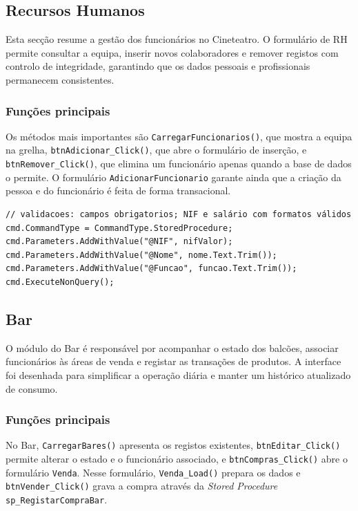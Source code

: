 \documentclass[11pt,a4paper]{article}
\begin{document}
\newpage

\subsection{Recursos Humanos}
Esta secção resume a gestão dos funcionários no Cineteatro. O formulário de RH permite consultar a equipa, inserir novos colaboradores e remover registos com controlo de integridade, garantindo que os dados pessoais e profissionais permanecem consistentes.

\subsubsection{Funções principais}
Os métodos mais importantes são \texttt{CarregarFuncionarios()}, que mostra a equipa na grelha, \texttt{btnAdicionar_Click()}, que abre o formulário de inserção, e \texttt{btnRemover_Click()}, que elimina um funcionário apenas quando a base de dados o permite. O formulário \texttt{AdicionarFuncionario} garante ainda que a criação da pessoa e do funcionário é feita de forma transacional.

\begin{lstlisting}[language={[Sharp]C}, caption=Inserção de funcionário (excerto)]
// validacoes: campos obrigatorios; NIF e salário com formatos válidos
cmd.CommandType = CommandType.StoredProcedure;
cmd.Parameters.AddWithValue("@NIF", nifValor);
cmd.Parameters.AddWithValue("@Nome", nome.Text.Trim());
cmd.Parameters.AddWithValue("@Funcao", funcao.Text.Trim());
cmd.ExecuteNonQuery();
\end{lstlisting}

\newpage

\subsection{Bar}
O módulo do Bar é responsável por acompanhar o estado dos balcões, associar funcionários às áreas de venda e registar as transações de produtos. A interface foi desenhada para simplificar a operação diária e manter um histórico atualizado de consumo.

\subsubsection{Funções principais}
No Bar, \texttt{CarregarBares()} apresenta os registos existentes, \texttt{btnEditar_Click()} permite alterar o estado e o funcionário associado, e \texttt{btnCompras_Click()} abre o formulário \texttt{Venda}. Nesse formulário, \texttt{Venda_Load()} prepara os dados e \texttt{btnVender_Click()} grava a compra através da \textit{Stored Procedure} \texttt{sp\_RegistarCompraBar}.
\end{document}
